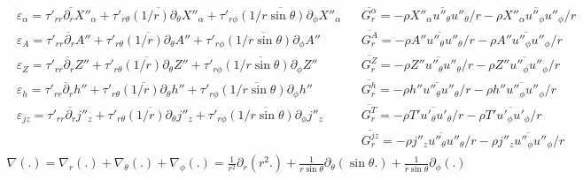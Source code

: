 \documentclass[10pt,paper=a4]{report}
\newcommand{\eht}{\overline}
\begin{document}
\begin{table*}
\begin{align}
& \varepsilon_\alpha = \eht{\tau'_{rr}\partial_r X''_\alpha} + \eht{\tau'_{r\theta}(1/r)\partial_\theta X''_\alpha} + \eht{\tau'_{r\phi}(1/r\sin{\theta})\partial_\phi X''_\alpha} & & \eht{G^{\alpha}_r} =  -\eht{\rho X''_\alpha u''_\theta u''_\theta/r} - \eht{\rho X''_\alpha u''_\phi u''_\phi/r} \nonumber \\  
& \varepsilon_A = \eht{\tau'_{rr}\partial_r A''} + \eht{\tau'_{r\theta}(1/r)\partial_\theta A''} + \eht{\tau'_{r\phi}(1/r\sin{\theta})\partial_\phi A''} & & \eht{G^A_r} =  -\eht{\rho A'' u''_\theta u''_\theta/r} - \eht{\rho A'' u''_\phi u''_\phi/r} \nonumber \\
& \varepsilon_Z = \eht{\tau'_{rr}\partial_r Z''} + \eht{\tau'_{r\theta}(1/r)\partial_\theta Z''} + \eht{\tau'_{r\phi}(1/r\sin{\theta})\partial_\phi Z''}& & \eht{G^Z_r} =  -\eht{\rho Z'' u''_\theta u''_\theta/r} - \eht{\rho Z'' u''_\phi u''_\phi/r} \nonumber \\
& \varepsilon_{h} = \eht{\tau'_{rr}\partial_r h''} + \eht{\tau'_{r\theta}(1/r)\partial_\theta h''} + \eht{\tau'_{r\phi}(1/r\sin{\theta})\partial_\phi h''} & & \eht{G^h_r} = -\eht{\rho h'' u''_\theta u''_\theta/r} - \eht{\rho h'' u''_\phi u''_\phi/r} \nonumber \\
& \varepsilon_{jz} = \eht{\tau'_{rr}\partial_r j''_z} + \eht{\tau'_{r\theta}(1/r)\partial_\theta j''_z} + \eht{\tau'_{r\phi}(1/r\sin{\theta})\partial_\phi j''_z} & & \eht{G^T_r} = -\eht{\rho T' u'_\theta u'_\theta/r} - \eht{\rho T' u'_\phi u'_\phi/r} \nonumber \\
& & & \eht{G^{jz}_r} = -\eht{\rho j''_z u''_\theta u''_\theta/r} - \eht{\rho j''_z u''_\phi u''_\phi/r} \nonumber 
\end{align}
\begin{align}
\nabla (.) = \nabla_r (.) + \nabla_\theta (.) + \nabla_\phi (.) = \frac{1}{r^2} \partial_r (r^2 . ) + \frac{1}{r\sin{\theta}} \partial_\theta (\sin{\theta} . ) + \frac{1}{r\sin{\theta}} \partial_\phi (.) \nonumber
\end{align}
\end{table*}





%
\end{document}

